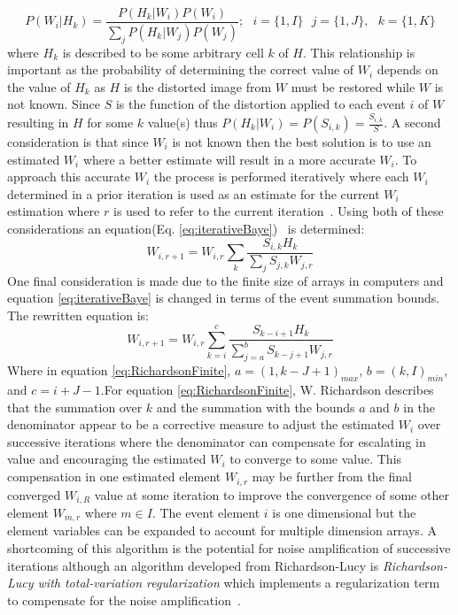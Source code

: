 \begin{equation}\label{eq:RichBayes}
	P(W_i|H_k)=\frac{P(H_k|W_i)P(W_i)}{\sum_j P(H_k|W_j)P(W_j)};\text{ }i=\{1,I\}\text{ }j=\{1,J\},\text{ }k=\{1, K\}
\end{equation}
where $H_k$ is described to be some arbitrary cell $k$ of $H$. This relationship is important as the probability of determining the correct value of $W_i$ depends on the value of $H_k$ as $H$ is the distorted image from $W$ must be restored while $W$ is not known. Since $S$ is the function of the distortion applied to each event $i$ of $W$ resulting in $H$ for some $k$ value(s) thus $P(H_k|W_i)=P(S_{i,k})=\frac{S_{i,k}}{S}$. A second consideration is that since $W_i$ is not known then the best solution is to use an estimated $W_i$ where a better estimate will result in a more accurate $W_i$. To approach this accurate $W_i$ the process is performed iteratively where each $W_i$ determined in a prior iteration is used as an estimate for the current $W_i$ estimation where $r$ is used to refer to the current iteration~\cite[Eq. 4]{Richardson}. Using both of these considerations an equation(Eq. \ref{eq:iterativeBaye})~\cite[Eq. 5]{Richardson} is determined:
\begin{equation}\label{eq:iterativeBaye}
	W_{i,r+1} = W_{i,r}\sum_k \frac{S_{i,k}H_k}{\sum_j S_{j,k}W_{j,r}}
\end{equation}
One final consideration is made due to the finite size of arrays in computers and equation \ref{eq:iterativeBaye} is changed in terms of the event summation bounds. The rewritten equation\cite[Eq. 6]{Richardson} is:
\begin{equation}\label{eq:RichardsonFinite}
	W_{i,r+1} = W_{i,r}\sum_{k=i}^c \frac{S_{k-i+1}H_k}{\sum_{j=a}^b S_{k-j+1}W_{j,r}}
\end{equation}
Where in equation \ref{eq:RichardsonFinite}, $a=(1, k-J+1)_{max}$, $b=(k,I)_{min}$, and $c=i+J-1$.For equation \ref{eq:RichardsonFinite}, W. Richardson describes that the summation over $k$ and the summation with the bounds $a$ and $b$ in the denominator appear to be a corrective measure to adjust the estimated $W_i$ over successive iterations where the denominator can compensate for escalating in value and encouraging the estimated $W_i$ to converge to some value. This compensation in one estimated element $W_{i,r}$ may be further from the final converged $W_{i,R}$ value at some iteration to improve the convergence of some other element $W_{m,r}$ where $m\in I$. The event element $i$ is one dimensional but the element variables can be expanded to account for multiple dimension arrays. A shortcoming of this algorithm is the potential for noise amplification of successive iterations although an algorithm developed from Richardson-Lucy is \textit{Richardson-Lucy with total-variation regularization} which implements a regularization term to compensate for the noise amplification~\cite[p.33]{DeconLab2}. 

